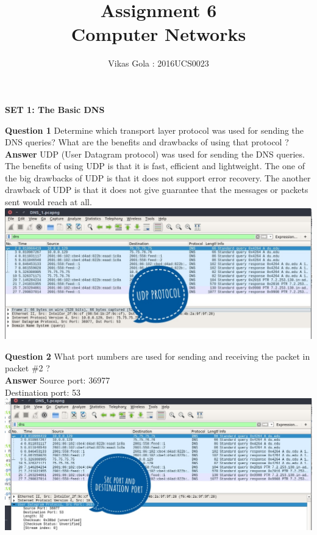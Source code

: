 \documentclass[14pt]{extarticle}
\begin{document}
    \pagestyle{plain}

    \title{\Huge Assignment 6\\ Computer Networks}
    \author{\huge Vikas Gola : 2016UCS0023}
    \maketitle
    \newpage


    \begin{center}
        {\Large \textbf{SET 1: The Basic DNS }}
    \end{center}
    
    \noindent
    \textbf{\large Question 1}
    Determine which transport layer protocol was used for sending the DNS queries? 
    What are the benefits and drawbacks of using that protocol ?\\[10pt]
    \textbf{\large Answer}
    UDP (User Datagram protocol) was used for sending the DNS queries. The benefits of using UDP is that it is fast, efficient and lightweight.
    The one of the big drawbacks of UDP is that it does not support error recovery. The another drawback of UDP is that it does not give guarantee that 
    the messages or packets sent would reach at all.\\[10pt]
    \includegraphics[scale=0.45]{1_1}
    \vspace{1cm}

    \noindent
    \textbf{\large Question 2}
    What port numbers are used for sending and receiving the packet in packet \#2 ?\\[10pt]
    \textbf{\large Answer}
    Source port: 36977\\
    Destination port: 53\\[10pt]
    \includegraphics[scale=0.45]{1_2}
    \vspace{1cm}
\end{document}
